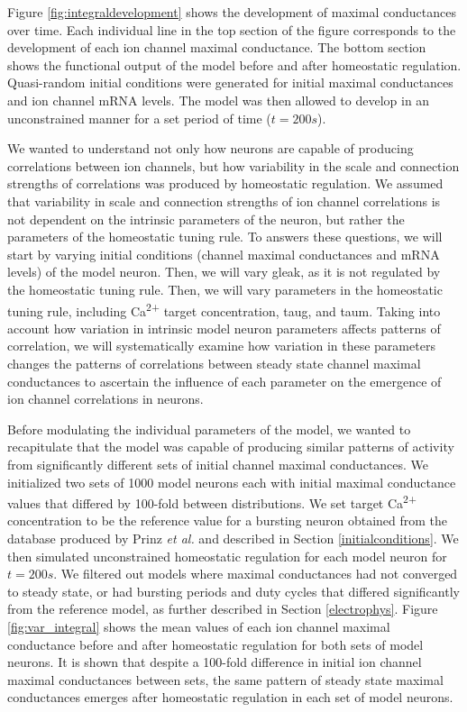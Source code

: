 Figure \ref{fig:integraldevelopment} shows the development of maximal conductances over time. Each individual line in the top section of the figure corresponds to the development of each ion channel maximal conductance. The bottom section shows the functional output of the model before and after homeostatic regulation. Quasi-random initial conditions were generated for initial maximal conductances and ion channel mRNA levels. The model was then allowed to develop in an unconstrained manner for a set period of time ($t = 200 s$).

We wanted to understand not only how neurons are capable of producing correlations between ion channels, but how variability in the scale and connection strengths of correlations was produced by homeostatic regulation.
We assumed that variability in scale and connection strengths of ion channel correlations is not dependent on the intrinsic parameters of the neuron, but rather the parameters of the homeostatic tuning rule.
To answers these questions, we will start by varying initial conditions (channel maximal conductances and mRNA levels) of the model neuron. Then, we will vary \acf{gleak}, as it is not regulated by the homeostatic tuning rule.
Then, we will vary parameters in the homeostatic tuning rule, including Ca\textsuperscript{2+} target concentration, \acf{taug}, and \acf{taum}.
Taking into account how variation in intrinsic model neuron parameters affects patterns of correlation, we will systematically examine how variation in these parameters changes the patterns of correlations between steady state channel maximal conductances to ascertain the influence of each parameter on the emergence of ion channel correlations in neurons.

Before modulating the individual parameters of the model, we wanted to recapitulate that the model was capable of producing similar patterns of activity from significantly different sets of initial channel maximal conductances\cite{oleary_cell_2014}. We initialized two sets of 1000 model neurons each with initial maximal conductance values that differed by 100-fold between distributions. We set target Ca\textsuperscript{2+} concentration to be the reference value for a bursting neuron obtained from the database produced by Prinz \textit{et al.} and described in Section \ref{initialconditions}\cite{prinz_alternative_2003}. We then simulated unconstrained homeostatic regulation for each model neuron for $t = 200s$. We filtered out models where maximal conductances had not converged to steady state, or had bursting periods and duty cycles that differed significantly from the reference model, as further described in Section \ref{electrophys}. Figure \ref{fig:var_integral} shows the mean values of each ion channel maximal conductance before and after homeostatic regulation for both sets of model neurons. It is shown that despite a 100-fold difference in initial ion channel maximal conductances between sets, the same pattern of steady state maximal conductances emerges after homeostatic regulation in each set of model neurons.

